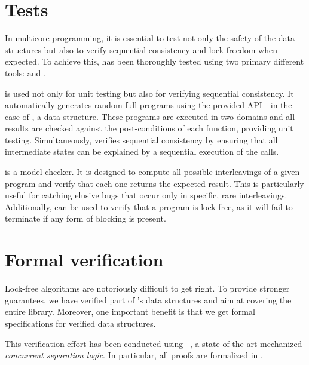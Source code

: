 \documentclass[a4paper, 11pt]{article}
\begin{document}


\section{Tests}

In multicore programming, it is essential to test not only the safety of the data structures but also to verify sequential consistency and lock-freedom when expected.
To achieve this, \Saturn has been thoroughly tested using two primary different tools: \DSCheck and \STM.

\STM is used not only for unit testing but also for verifying sequential consistency.
It automatically generates random full programs using the provided API---in the case of \Saturn, a data structure.
These programs are executed in two domains and all results are checked against the post-conditions of each function, providing unit testing.
Simultaneously, \STM verifies sequential consistency by ensuring that all intermediate states can be explained by a sequential execution of the calls.

\DSCheck is a model checker.
It is designed to compute all possible interleavings of a given program and verify that each one returns the expected result.
This is particularly useful for catching elusive bugs that occur only in specific, rare interleavings.
Additionally, \DSCheck can be used to verify that a program is lock-free, as it will fail to terminate if any form of blocking is present.

\section{Formal verification}

Lock-free algorithms are notoriously difficult to get right.
To provide stronger guarantees, we have verified part of \Saturn's data structures and aim at covering the entire library.
Moreover, one important benefit is that we get formal specifications for verified data structures.

This verification effort has been conducted using \Iris~\cite{DBLP:journals/jfp/JungKJBBD18}, a state-of-the-art mechanized \emph{concurrent separation logic}.
In particular, all proofs are formalized in \Coq.
\end{document}
